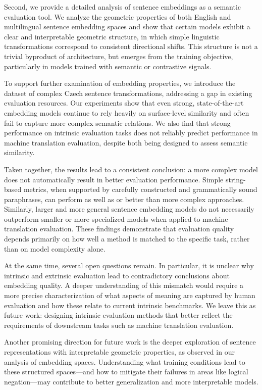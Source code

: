 Second, we provide a detailed analysis of sentence embeddings as a semantic evaluation tool. We analyze the geometric properties of both English and multilingual sentence embedding spaces and show that certain models exhibit a clear and interpretable geometric structure, in which simple linguistic transformations correspond to consistent directional shifts. This structure is not a trivial byproduct of architecture, but emerges from the training objective, particularly in models trained with semantic or contrastive signals.

To support further examination of embedding properties, we introduce the \costra dataset of complex Czech sentence transformations, addressing a gap in existing evaluation resources. Our experiments show that even strong, state-of-the-art embedding models continue to rely heavily on surface-level similarity and often fail to capture more complex semantic relations. We also find that strong performance on intrinsic evaluation tasks does not reliably predict performance in machine translation evaluation, despite both being designed to assess semantic similarity.

Taken together, the results lead to a consistent conclusion: a more complex model does not automatically result in better evaluation performance. Simple string-based metrics, when supported by carefully constructed and grammatically sound paraphrases, can perform as well as or better than more complex approaches. Similarly, larger and more general sentence embedding models do not necessarily outperform smaller or more specialized models when applied to machine translation evaluation. These findings demonstrate that evaluation quality depends primarily on how well a method is matched to the specific task, rather than on model complexity alone.

At the same time, several open questions remain. In particular, it is unclear why intrinsic and extrinsic evaluation lead to contradictory conclusions about embedding quality. A deeper understanding of this mismatch would require a more precise characterization of what aspects of meaning are captured by human evaluation and how these relate to current intrinsic benchmarks. We leave this as future work: designing intrinsic evaluation methods that better reflect the requirements of downstream tasks such as machine translation evaluation.

Another promising direction for future work is the deeper exploration of sentence representations with interpretable geometric properties, as observed in our analysis of embedding spaces. Understanding what training conditions lead to these structured spaces---and how to mitigate their failures in areas like logical negation---may contribute to better generalization and more interpretable models.
